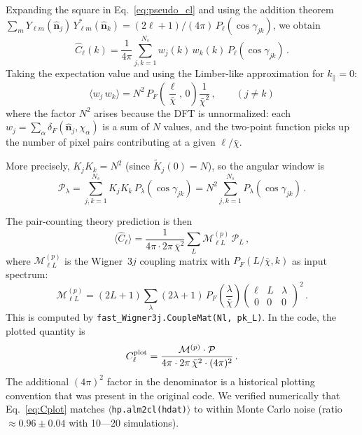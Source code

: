 \documentclass[11pt,a4paper]{article}
\newcommand{\chibar}{\bar{\chi}}
\newcommand{\hchi}{\hat{\bm{n}}}
\newcommand{\PF}{P_{\!F}}
\newcommand{\Cl}{\hat{C}_\ell}
\begin{document}
Expanding the square in Eq.~\eqref{eq:pseudo_cl} and using the addition
theorem $\sum_m Y_{\ell m}(\hchi_j)\,Y_{\ell m}^*(\hchi_k) =
(2\ell+1)/(4\pi)\,P_\ell(\cos\gamma_{jk})$, we obtain
\begin{equation}
  \Cl(k) = \frac{1}{4\pi}
  \sum_{j,k=1}^{N_s} w_j(k)\,w_k(k)\,P_\ell(\cos\gamma_{jk})\,.
  \label{eq:pair_sum}
\end{equation}
Taking the expectation value and using the Limber-like approximation
for $k_\parallel = 0$:
\begin{equation}
  \langle w_j\, w_k \rangle
  = N^2\,\PF\!\left(\frac{\ell}{\chibar},\,0\right)
  \frac{1}{\chibar^2}\,,
  \qquad (j \neq k)
  \label{eq:ww_offdiag}
\end{equation}
where the factor $N^2$ arises because the DFT is unnormalized:
each $w_j = \sum_\alpha \delta_F(\hchi_j,\chi_\alpha)$
is a sum of $N$ values, and the two-point function picks up the
number of pixel pairs contributing at a given $\ell/\chibar$.

More precisely, $K_j K_k = N^2$ (since $\tilde{K}_j(0)=N$), so the
angular window is
\begin{equation}
  \mathcal{P}_\lambda = \sum_{j,k=1}^{N_s} K_j K_k\,P_\lambda(\cos\gamma_{jk})
  = N^2 \sum_{j,k=1}^{N_s} P_\lambda(\cos\gamma_{jk})\,.
  \label{eq:PLKjKk}
\end{equation}

The pair-counting theory prediction is then
\begin{equation}
  \langle \Cl \rangle
  = \frac{1}{4\pi\cdot 2\pi\,\chibar^2}
  \sum_L \mathcal{M}_{\ell L}^{(p)}\, \mathcal{P}_L\,,
  \label{eq:theory_pair}
\end{equation}
where $\mathcal{M}_{\ell L}^{(p)}$ is the Wigner~3$j$ coupling matrix
with $\PF(L/\chibar,k)$ as input spectrum:
\begin{equation}
  \mathcal{M}_{\ell L}^{(p)} = (2L+1)
  \sum_\lambda (2\lambda+1)\,\PF\!\left(\frac{\lambda}{\chibar}\right)
  \begin{pmatrix} \ell & L & \lambda \\ 0 & 0 & 0 \end{pmatrix}^{\!2}\,.
  \label{eq:M_pk}
\end{equation}
This is computed by \texttt{fast\_Wigner3j.CoupleMat(Nl, pk\_L)}.
In the code, the plotted quantity is
\begin{equation}
  C_\ell^{\rm plot} = \frac{\mathcal{M}^{(p)} \cdot \mathcal{P}}
  {4\pi\cdot 2\pi\,\chibar^2 \cdot (4\pi)^2}\,.
  \label{eq:Cplot}
\end{equation}
The additional $(4\pi)^2$ factor in the denominator is a historical plotting
convention that was present in the original code.  We verified numerically
that Eq.~\eqref{eq:Cplot} matches $\langle${\tt hp.alm2cl(hdat)}$\rangle$
to within Monte Carlo noise (ratio $\approx 0.96 \pm 0.04$ with 10---20 simulations).
\end{document}
